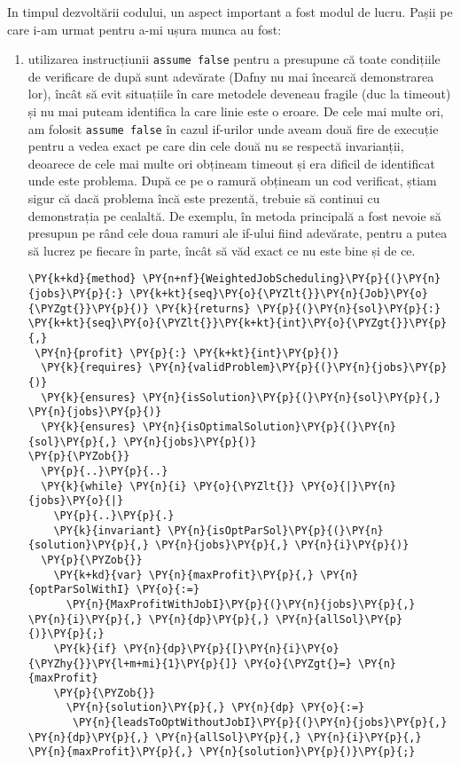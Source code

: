 In timpul dezvoltării codului, un aspect important a fost modul de lucru. Pașii pe care i-am urmat pentru a-mi ușura munca au fost:
\begin{enumerate}
    \item utilizarea instrucțiunii \texttt{assume false} pentru a presupune că toate condițiile de verificare de după sunt adevărate (Dafny nu mai încearcă demonstrarea lor), încât să evit situațiile în care metodele deveneau fragile (duc la timeout) și nu mai puteam identifica la care linie este o eroare. 
    De cele mai multe ori, am folosit \texttt{assume false} în cazul if-urilor unde aveam două fire de execuție pentru a vedea exact pe care din cele două nu se respectă invarianții, deoarece de cele mai multe ori obțineam timeout și era dificil de identificat unde este problema. După ce pe o ramură obțineam un cod verificat, știam sigur că dacă problema încă este prezentă, trebuie să continui cu demonstrația pe cealaltă.
    De exemplu, în metoda principală a fost nevoie să presupun pe rând cele doua ramuri ale if-ului fiind adevărate, pentru a putea să lucrez pe fiecare în parte, încât să văd exact ce nu este bine și de ce.
    \begin{Verbatim}[commandchars=\\\{\}, fontsize=\footnotesize]
\PY{k+kd}{method} \PY{n+nf}{WeightedJobScheduling}\PY{p}{(}\PY{n}{jobs}\PY{p}{:} \PY{k+kt}{seq}\PY{o}{\PYZlt{}}\PY{n}{Job}\PY{o}{\PYZgt{}}\PY{p}{)} \PY{k}{returns} \PY{p}{(}\PY{n}{sol}\PY{p}{:} \PY{k+kt}{seq}\PY{o}{\PYZlt{}}\PY{k+kt}{int}\PY{o}{\PYZgt{}}\PY{p}{,}
 \PY{n}{profit} \PY{p}{:} \PY{k+kt}{int}\PY{p}{)}
  \PY{k}{requires} \PY{n}{validProblem}\PY{p}{(}\PY{n}{jobs}\PY{p}{)}
  \PY{k}{ensures} \PY{n}{isSolution}\PY{p}{(}\PY{n}{sol}\PY{p}{,} \PY{n}{jobs}\PY{p}{)}
  \PY{k}{ensures} \PY{n}{isOptimalSolution}\PY{p}{(}\PY{n}{sol}\PY{p}{,} \PY{n}{jobs}\PY{p}{)}
\PY{p}{\PYZob{}}
  \PY{p}{..}\PY{p}{..}
  \PY{k}{while} \PY{n}{i} \PY{o}{\PYZlt{}} \PY{o}{|}\PY{n}{jobs}\PY{o}{|}
    \PY{p}{..}\PY{p}{.}
    \PY{k}{invariant} \PY{n}{isOptParSol}\PY{p}{(}\PY{n}{solution}\PY{p}{,} \PY{n}{jobs}\PY{p}{,} \PY{n}{i}\PY{p}{)}
  \PY{p}{\PYZob{}}
    \PY{k+kd}{var} \PY{n}{maxProfit}\PY{p}{,} \PY{n}{optParSolWithI} \PY{o}{:=}
      \PY{n}{MaxProfitWithJobI}\PY{p}{(}\PY{n}{jobs}\PY{p}{,} \PY{n}{i}\PY{p}{,} \PY{n}{dp}\PY{p}{,} \PY{n}{allSol}\PY{p}{)}\PY{p}{;}
    \PY{k}{if} \PY{n}{dp}\PY{p}{[}\PY{n}{i}\PY{o}{\PYZhy{}}\PY{l+m+mi}{1}\PY{p}{]} \PY{o}{\PYZgt{}=} \PY{n}{maxProfit} 
    \PY{p}{\PYZob{}}
      \PY{n}{solution}\PY{p}{,} \PY{n}{dp} \PY{o}{:=}
       \PY{n}{leadsToOptWithoutJobI}\PY{p}{(}\PY{n}{jobs}\PY{p}{,} \PY{n}{dp}\PY{p}{,} \PY{n}{allSol}\PY{p}{,} \PY{n}{i}\PY{p}{,} \PY{n}{maxProfit}\PY{p}{,} \PY{n}{solution}\PY{p}{)}\PY{p}{;}

\end{Verbatim}
\end{enumerate}
